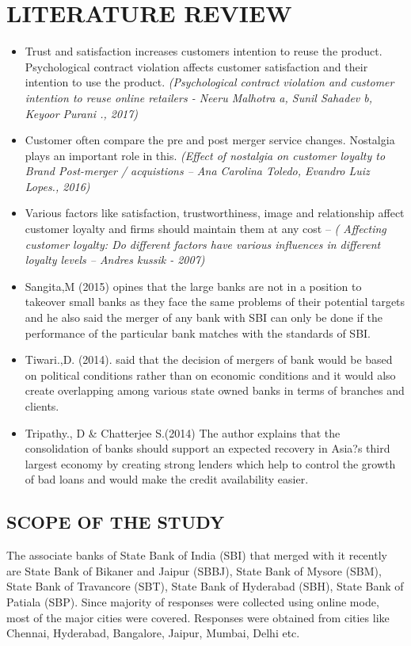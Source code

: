 \documentclass[a4paper, 14pt]{article}
\begin{document}
{\section{LITERATURE REVIEW}
\begin{itemize}
\item Trust and satisfaction increases customers intention to reuse the product. Psychological contract violation affects customer satisfaction and their intention to use the product. \emph{(Psychological contract violation and customer intention to reuse online retailers - Neeru Malhotra a, Sunil Sahadev b, Keyoor Purani ., 2017)}
\item Customer often compare the pre and post merger service changes. Nostalgia plays an important role in this. \emph{(Effect of nostalgia on customer loyalty to Brand Post-merger / acquistions – Ana Carolina Toledo, Evandro Luiz Lopes., 2016)}
\item Various factors like satisfaction, trustworthiness, image and relationship affect customer loyalty and firms should maintain them at any cost – \emph{( Affecting customer loyalty: Do different factors have various influences in different loyalty levels – Andres kussik  - 2007)}
\item Sangita,M (2015) opines that the large banks are not in a position to takeover small banks as they face the same problems of their potential targets and he also said the merger of any bank with SBI can only be done if the performance of the particular bank matches with the standards of SBI. 
\item Tiwari.,D. (2014). said that the decision of mergers of bank would be based on political conditions rather than on economic conditions and it would also create overlapping among various state owned banks in terms of branches and clients.
\item Tripathy., D \& Chatterjee S.(2014) The author explains that the consolidation of banks should support an expected recovery in Asia?s third largest economy by creating strong lenders which help to control the growth of bad loans and would make the credit availability easier. 
\end{itemize}
\subsection{SCOPE OF THE STUDY}
The associate banks of State Bank of India (SBI) that merged with it recently are State Bank of Bikaner and Jaipur (SBBJ), State Bank of Mysore (SBM), State Bank of Travancore (SBT), State Bank of Hyderabad (SBH), State Bank of Patiala (SBP). Since majority of responses were collected using online mode, most of the major cities were covered. Responses were obtained from cities like Chennai, Hyderabad, Bangalore, Jaipur, Mumbai, Delhi etc.
}
\end{document}
